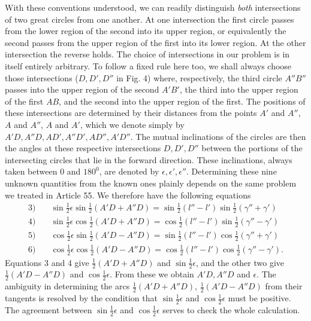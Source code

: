 With these conventions understood, we can readily distinguish \emph{both} intersections of two
great circles from one another. At one intersection the first circle passes from the lower
region of the second into its upper region, or equivalently the second passes from the upper
region of the first into its lower region. At the other intersection the reverse holds. The
choice of intersections in our problem is in itself entirely arbitrary. To follow a fixed rule
here too, we shall always choose those intersections ($D,D',D''$ in Fig. 4) where, respectively, the
third circle $A''B''$ passes into the upper region of the second $A'B'$, the third into the upper
region of the first $AB$, and the second into the upper region of the first. The positions of
these intersections are determined by \hypertarget{native-184}{}their distances from the points $A'$ and $A''$,
$A$ and $A''$, $A$ and $A'$, which we denote simply by $A'D,A''D,AD',A''D',AD'',A'D''$. The mutual inclinations
of the circles are then the angles at these respective intersections $D,D',D''$ between the portions
of the intersecting circles that lie in the forward direction. These inclinations, always taken
between $0$ and $180^0$, are denoted by $\epsilon,\epsilon',\epsilon''$. Determining these nine unknown quantities from
the known ones plainly depends on the same problem we treated in Article 55. We therefore have
the following equations
\[
\begin{aligned}
3)\quad&\sin\tfrac12\epsilon\sin\tfrac12(A'D+A''D)=\sin\tfrac12(l''-l')\sin\tfrac12(\gamma''+\gamma')\\[.5ex]
4)\quad&\sin\tfrac12\epsilon\cos\tfrac12(A'D+A''D)=\cos\tfrac12(l''-l')\sin\tfrac12(\gamma''-\gamma')\\[.5ex]
5)\quad&\cos\tfrac12\epsilon\sin\tfrac12(A'D-A''D)=\sin\tfrac12(l''-l')\cos\tfrac12(\gamma''+\gamma')\\[.5ex]
6)\quad&\cos\tfrac12\epsilon\cos\tfrac12(A'D-A''D)=\cos\tfrac12(l''-l')\cos\tfrac12(\gamma''-\gamma').
\end{aligned}
\]
Equations 3 and 4 give $\tfrac12(A'D+A''D)$ and $\sin\tfrac12\epsilon$, and the other two give $\tfrac12(A'D-A''D)$ and $\cos\tfrac12\epsilon$. From these
we obtain $A'D,A''D$ and $\epsilon$. The ambiguity in determining the arcs $\tfrac12(A'D+A''D)$, $\tfrac12(A'D-A''D)$ from their
tangents is resolved by the condition that $\sin\tfrac12\epsilon$ and $\cos\tfrac12\epsilon$ must be positive. The agreement
between $\sin\tfrac12\epsilon$ and $\cos\tfrac12\epsilon$ serves to check the whole calculation.

